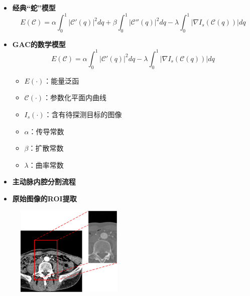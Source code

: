 \begin{frame}
\begin{itemize}
\item \textbf{经典“蛇”模型}
\begin{equation*}
E(\mathcal{C}) = \alpha \int_0^1 | \mathcal{C}'(q) |^2 dq + \beta \int_0^1 | \mathcal{C}''(q) |^2 dq - \lambda \int_0^1 | \nabla I_{s} ( \mathcal{C}(q) ) |dq
\end{equation*}
\item \textbf{GAC的数学模型}
\begin{equation*}
E(\mathcal{C}) = \alpha \int_0^1 | \mathcal{C}'(q) |^2 dq - \lambda \int_0^1 | \nabla I_{s} ( \mathcal{C}(q) ) |dq
\end{equation*}
\begin{itemize}
\item $E(\cdot)$：能量泛函
\item $\mathcal{C}(\cdot)$：参数化平面内曲线
\item $I_{s}(\cdot)$：含有待探测目标的图像
\item $\alpha$：传导常数
\item $\beta$：扩散常数
\item $\lambda$：曲率常数
\end{itemize}
\end{itemize}
\end{frame}

\begin{frame}
\begin{itemize}
\item \textbf{主动脉内腔分割流程}
\end{itemize}
\begin{figure}[t]
\centering

\end{figure}
\end{frame}

\begin{frame}
\begin{itemize}
\item \textbf{原始图像的ROI提取}
\end{itemize}
\begin{figure}[t]
\centering
\includegraphics[width=2.0in]{../../Figures/gac/ROI.eps}
\end{figure}
\end{frame}

